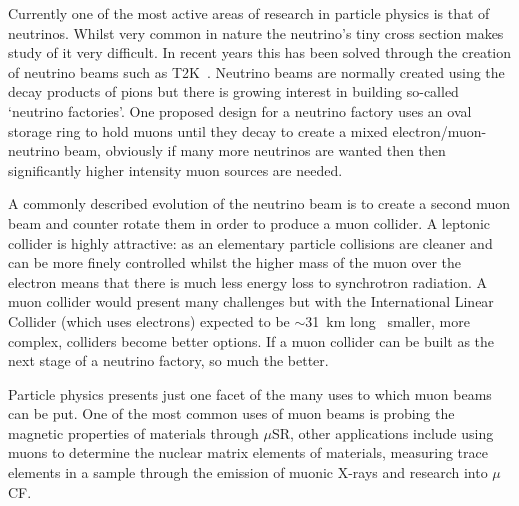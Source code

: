 Currently one of the most active areas of research in particle physics is that of neutrinos. Whilst very common in nature the neutrino's tiny cross section makes study of it very difficult. In recent years this has been solved through the creation of neutrino beams such as T2K~\cite{t2k_cdr}. Neutrino beams are normally created using the decay products of pions but there is growing interest in building so-called `neutrino factories'. One proposed design for a neutrino factory uses an oval storage ring to hold muons until they decay to create a mixed electron/muon-neutrino beam, obviously if many more neutrinos are wanted then then significantly higher intensity muon sources are needed.

A commonly described evolution of the neutrino beam is to create a second muon beam and counter rotate them in order to produce a muon collider. A leptonic collider is highly attractive: as an elementary particle collisions are cleaner and can be more finely controlled whilst the higher mass of the muon over the electron means that there is much less energy loss to synchrotron radiation. A muon collider would present many challenges but with the International Linear Collider (which uses electrons) expected to be \(\sim\)31~km long~\cite{ilc} smaller, more complex, colliders become better options. If a muon collider can be built as the next stage of a neutrino factory, so much the better.

Particle physics presents just one facet of the many uses to which muon beams can be put. One of the most common uses of muon beams is probing the magnetic properties of materials through \(\mu\)SR, other applications include using muons to determine the nuclear matrix elements of materials, measuring trace elements in a sample through the emission of muonic X-rays and research into \(\mu\)CF.

